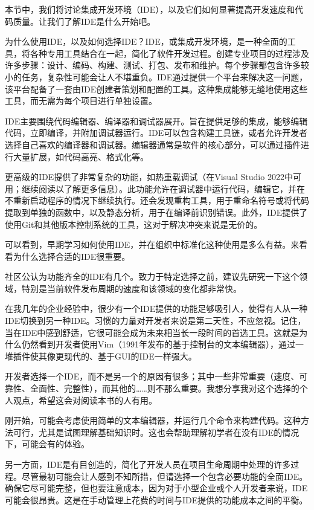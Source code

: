 本节中，我们将讨论集成开发环境（IDE），以及它们如何显著提高开发速度和代码质量。让我们了解IDE是什么开始吧。

为什么使用IDE，以及如何选择IDE？IDE，或集成开发环境，是一种全面的工具，将各种专用工具结合在一起，简化了软件开发过程。创建专业项目的过程涉及许多步骤：设计、编码、构建、测试、打包、发布和维护。每个步骤都包含许多较小的任务，复杂性可能会让人不堪重负。IDE通过提供一个平台来解决这一问题，该平台配备了一套由IDE创建者策划和配置的工具。这种集成能够无缝地使用这些工具，而无需为每个项目进行单独设置。

IDE主要围绕代码编辑器、编译器和调试器展开。旨在提供足够的集成，能够编辑代码，立即编译，并附加调试器运行。IDE可以包含构建工具链，或者允许开发者选择自己喜欢的编译器和调试器。编辑器通常是软件的核心部分，可以通过插件进行大量扩展，如代码高亮、格式化等。

更高级的IDE提供了非常复杂的功能，如热重载调试（在Visual Studio 2022中可用；继续阅读以了解更多信息）。此功能允许在调试器中运行代码，编辑它，并在不重新启动程序的情况下继续执行。还会发现重构工具，用于重命名符号或将代码提取到单独的函数中，以及静态分析，用于在编译前识别错误。此外，IDE提供了使用Git和其他版本控制系统的工具，这对于解决冲突来说是无价的。

可以看到，早期学习如何使用IDE，并在组织中标准化这种使用是多么有益。来看看为什么选择合适的IDE很重要。


社区公认为功能齐全的IDE有几个。致力于特定选择之前，建议先研究一下这个领域，特别是当前软件发布周期的速度和该领域的变化都非常快。

在我几年的企业经验中，很少有一个IDE提供的功能足够吸引人，使得有人从一种IDE切换到另一种IDE。习惯的力量对开发者来说是第二天性，不应忽视。记住，当在IDE中感到舒适，它很可能会成为未来相当长一段时间的首选工具。这就是为什么仍然看到开发者使用Vim（1991年发布的基于控制台的文本编辑器），通过一堆插件使其像更现代的、基于GUI的IDE一样强大。

开发者选择一个IDE，而不是另一个的原因有很多；其中一些非常重要（速度、可靠性、全面性、完整性），而其他的……则不那么重要。我想分享我对这个选择的个人观点，希望这会对阅读本书的人有用。


刚开始，可能会考虑使用简单的文本编辑器，并运行几个命令来构建代码。这种方法可行，尤其是试图理解基础知识时。这也会帮助理解初学者在没有IDE的情况下，可能会有的体验。

另一方面，IDE是有目创造的，简化了开发人员在项目生命周期中处理的许多过程。尽管最初可能会让人感到不知所措，但请选择一个包含必要功能的全面IDE。确保它尽可能完整，但也要注意成本，因为对于小型企业或个人开发者来说，IDE可能会很昂贵。这是在手动管理上花费的时间与IDE提供的功能成本之间的平衡。

